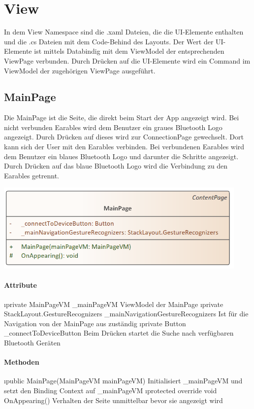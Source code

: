 \documentclass[../entwurf.tex]{subfiles}
\begin{document}
\section{View}
In dem View Namespace sind die .xaml Dateien, die die UI-Elemente enthalten und die .cs Dateien mit dem Code-Behind des Layouts. Der Wert der UI-Elemente ist mittels Databindig mit dem ViewModel der entsprechenden ViewPage verbunden. Durch Drücken auf die UI-Elemente wird ein Command im ViewModel der zugehörigen ViewPage ausgeführt. 
\subsection{MainPage}
Die MainPage ist die Seite, die direkt beim Start der App angezeigt wird. Bei nicht verbunden Earables wird dem Benutzer ein graues Bluetooth Logo angezeigt. Durch Drücken auf dieses wird zur ConnectionPage gewechselt. Dort kann sich der User mit den Earables verbinden. Bei verbundenen Earables wird dem Benutzer ein blaues Bluetooth Logo und darunter die Schritte angezeigt. Durch Drücken auf das blaue Bluetooth Logo wird die Verbindung zu den Earables getrennt. 

\begin{center}
	\includegraphics[page=1,width=350pt,keepaspectratio]{../uml_klassen/View/MainPage.png}
\end{center}

\paragraph{Attribute}

\begin{itemize}
	\i{private MainPageVM \_mainPageVM} ViewModel der MainPage
	\i{private StackLayout.GestureRecognizers \_mainNavigationGestureRecognizers} Ist für die Navigation von der MainPage aus zuständig
	\i{private Button \_connectToDeviceButton} Beim Drücken startet die Suche nach verfügbaren Bluetooth Geräten
\end{itemize}
\paragraph{Methoden}
\begin{itemize}
	\i{public MainPage(MainPageVM mainPageVM)} Initialisiert \_mainPageVM und setzt den Binding Context 			auf \_mainPageVM
	\i{protected override void OnAppearing()} Verhalten der Seite unmittelbar bevor sie angezeigt wird
\end{itemize}
\end{document}
